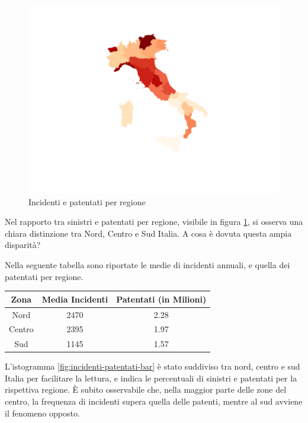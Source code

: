 \documentclass[a4paper,12pt]{report}
\begin{document}
\begin{figure}
    \hfill\includegraphics[width=\linewidth]{../src/incidenti/incidenti_aci/mappe_regioni/incidenti_patenti_italia.png}\hspace*{\fill}
    \caption{Incidenti e patentati per regione}
    \label{fig:incidenti-patentati}
\end{figure}

Nel rapporto tra sinistri e patentati per regione, 
visibile in figura \ref{fig:incidenti-patentati}, 
si osserva una chiara distinzione tra Nord, Centro e Sud Italia. 
A cosa è dovuta questa ampia disparità?

Nella seguente tabella sono riportate le medie di incidenti annuali, 
e quella dei patentati per regione. 

\begin{center}
    \def\arraystretch{1.5}%
    \begin{tabular}{ |c|c|c| } 
    \hline
    Zona & Media Incidenti & Patentati (in Milioni) \\ 
    \hline
    \rowcolor{TableGray}
    Nord    &   2470 &   2.28 \\ 
    Centro  &   2395 &   1.97 \\ 
    \rowcolor{TableGray}
    Sud     &   1145 &   1.57 \\ 
    \hline
    \end{tabular}
\end{center}

L'istogramma \ref{fig:incidenti-patentati-bar} è stato suddiviso tra nord, 
centro e sud Italia per facilitare la lettura, e indica le percentuali di sinistri e 
patentati per la rispettiva regione. 
\`E subito osservabile che, nella maggior parte delle zone del centro, 
la frequenza di incidenti supera quella delle patenti, 
mentre al sud avviene il fenomeno opposto. 
\end{document}
